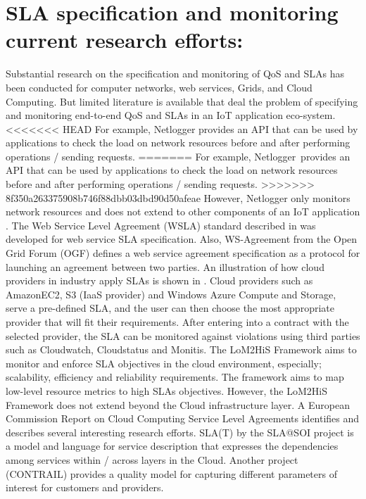 \section{SLA specification and monitoring current research efforts:}

Substantial research on the specification and monitoring of QoS and SLAs has been conducted for computer networks, web services, Grids, and Cloud Computing.
But limited literature is available that deal the problem of specifying and monitoring end-to-end QoS and SLAs in an IoT application eco-system.
<<<<<<< HEAD
For example, Netlogger provides an API that can be used by applications to check the load on network resources before and after performing operations / sending requests.
=======
For example, Netlogger provides an API that can be used by applications to check the load on network resources before and after performing operations / sending requests.
>>>>>>> 8f350a263375908b746f88dbb03dbd90d50afeae
However, Netlogger only monitors network resources and does not extend to other components of an IoT application \cite{ref14,ref15}.
The Web Service Level Agreement (WSLA) standard described in \cite{ref16} was developed for web service SLA specification.
Also, WS-Agreement from the Open Grid Forum (OGF) defines a web service agreement specification as a protocol for launching an agreement between two parties.
An illustration of how cloud providers in industry apply SLAs is shown in \cite{ref21}.
Cloud providers such as AmazonEC2, S3 (IaaS provider) and Windows Azure Compute and Storage, serve a pre-defined SLA, and the user can then choose the most appropriate provider that will fit their requirements.
After entering into a contract with the selected provider, the SLA can be monitored against violations using third parties such as Cloudwatch, Cloudstatus and Monitis.
The LoM2HiS Framework \cite{ref14} aims to monitor and enforce SLA objectives in the cloud environment, especially; scalability, efficiency and reliability requirements.
The framework aims to map low-level resource metrics to high SLAs objectives.
However, the LoM2HiS Framework does not extend beyond the Cloud infrastructure layer.
A European Commission Report on Cloud Computing Service Level Agreements \cite{ref24} identifies and describes several interesting research efforts.
SLA(T) by the SLA@SOI project \cite{ref25,ref27} is a model and language for service description that expresses the dependencies among services within / across layers in the Cloud. Another project (CONTRAIL) provides a quality model \cite{ref28} for capturing different parameters of interest for customers and providers.
